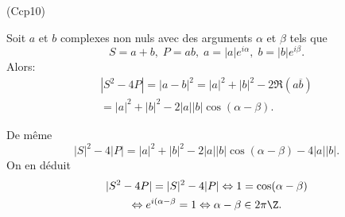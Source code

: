 \begin{tiny} (Ccp10) \end{tiny} Soit $a$ et $b$ complexes non nuls avec des arguments $\alpha$ et $\beta$ tels que
\[
 S = a + b, \; P = ab, \;
 a = |a|e^{i\alpha}, \; b = |b|e^{i\beta}.
\]
Alors:
\begin{multline*}
 |S^2 - 4P| = |a-b|^2 = |a|^2 + |b|^2 - 2\Re(a\overline{b})\\
 = |a|^2 + |b|^2 - 2|a||b|\cos(\alpha - \beta).
\end{multline*}

De même
\[
 |S|^2 - 4|P| = |a|^2 + |b|^2 - 2|a||b|\cos(\alpha - \beta) - 4|a||b|.
\]
On en déduit
\begin{multline*}
 |S^2 - 4P| = |S|^2 - 4|P|
 \Leftrightarrow
 1 = \cos(\alpha - \beta) \\
 \Leftrightarrow
 e^{i(\alpha - \beta} = 1
 \Leftrightarrow
 \alpha - \beta \in 2\pi \Z.
\end{multline*}


